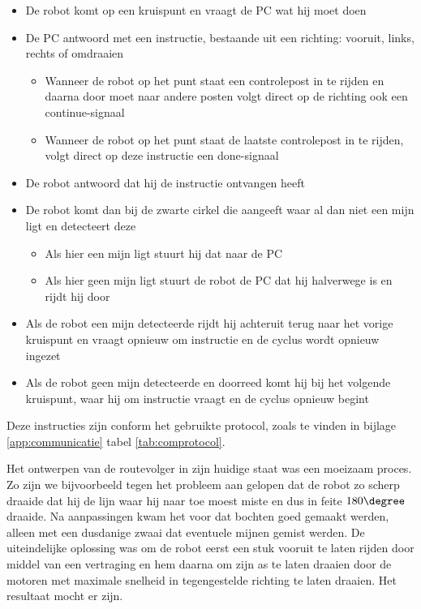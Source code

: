 \documentclass{report}
\begin{document}
\begin{itemize}
	\item De robot komt op een kruispunt en vraagt de PC wat hij moet doen
	\item De PC antwoord met een instructie, bestaande uit een richting: vooruit, links, rechts of omdraaien
		\begin{itemize}
			\item Wanneer de robot op het punt staat een controlepost in te rijden en daarna door moet naar andere posten volgt direct op de richting ook een continue-signaal
			\item Wanneer de robot op het punt staat de laatste controlepost in te rijden, volgt direct op deze instructie een done-signaal
		\end{itemize}
	\item De robot antwoord dat hij de instructie ontvangen heeft
	\item De robot komt dan bij de zwarte cirkel die aangeeft waar al dan niet een mijn ligt en detecteert deze
		\begin{itemize}
			\item Als hier een mijn ligt stuurt hij dat naar de PC
			\item Als hier geen mijn ligt stuurt de robot de PC dat hij halverwege is en rijdt hij door
		\end{itemize}
	\item Als de robot een mijn detecteerde rijdt hij achteruit terug naar het vorige kruispunt en vraagt opnieuw om instructie en de cyclus wordt opnieuw ingezet
	\item Als de robot geen mijn detecteerde en doorreed komt hij bij het volgende kruispunt, waar hij om instructie vraagt en de cyclus opnieuw begint
\end{itemize}

Deze instructies zijn conform het gebruikte protocol, zoals te vinden in bijlage \ref{app:communicatie} tabel \ref{tab:comprotocol}.

Het ontwerpen van de routevolger in zijn huidige staat was een moeizaam proces. Zo zijn we bijvoorbeeld tegen het probleem aan gelopen dat de robot zo scherp draaide dat hij de lijn waar hij naar toe moest miste en dus in feite $180\degree$ draaide. Na aanpassingen kwam het voor dat bochten goed gemaakt werden, alleen met een dusdanige zwaai dat eventuele mijnen gemist werden. De uiteindelijke oplossing was om de robot eerst een stuk vooruit te laten rijden door middel van een vertraging en hem daarna om zijn as te laten draaien door de motoren met maximale snelheid in tegengestelde richting te laten draaien. Het resultaat mocht er zijn.
\end{document}
